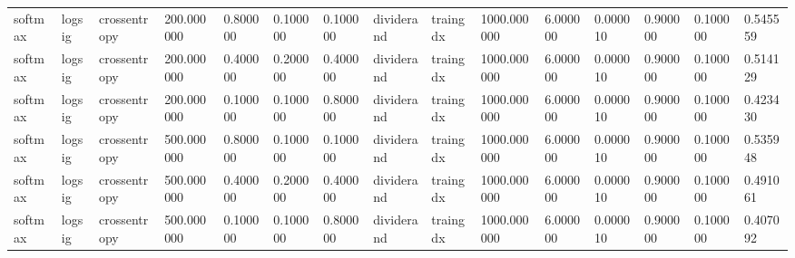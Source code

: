 \begin{tabular}{lllllllllllllll}
softmax & logsig & crossentropy & 200.000000 & 0.800000 & 0.100000 & 0.100000 & dividerand & traingdx & 1000.000000 & 6.000000 & 0.000010 & 0.900000 & 0.100000 & 0.545559 \\ 
softmax & logsig & crossentropy & 200.000000 & 0.400000 & 0.200000 & 0.400000 & dividerand & traingdx & 1000.000000 & 6.000000 & 0.000010 & 0.900000 & 0.100000 & 0.514129 \\ 
softmax & logsig & crossentropy & 200.000000 & 0.100000 & 0.100000 & 0.800000 & dividerand & traingdx & 1000.000000 & 6.000000 & 0.000010 & 0.900000 & 0.100000 & 0.423430 \\ 
softmax & logsig & crossentropy & 500.000000 & 0.800000 & 0.100000 & 0.100000 & dividerand & traingdx & 1000.000000 & 6.000000 & 0.000010 & 0.900000 & 0.100000 & 0.535948 \\ 
softmax & logsig & crossentropy & 500.000000 & 0.400000 & 0.200000 & 0.400000 & dividerand & traingdx & 1000.000000 & 6.000000 & 0.000010 & 0.900000 & 0.100000 & 0.491061 \\ 
softmax & logsig & crossentropy & 500.000000 & 0.100000 & 0.100000 & 0.800000 & dividerand & traingdx & 1000.000000 & 6.000000 & 0.000010 & 0.900000 & 0.100000 & 0.407092 \\ 
\hline 
\end{tabular}